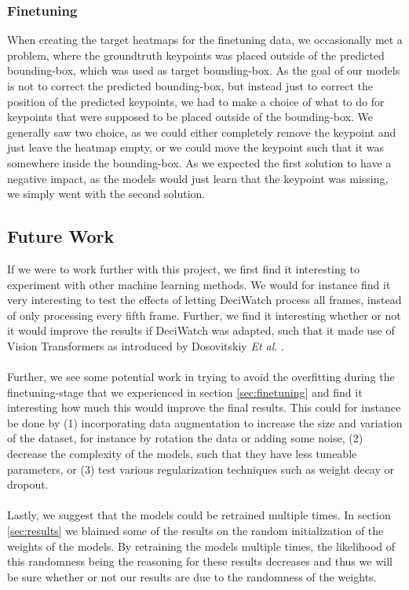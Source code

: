 \documentclass[./main.tex]{subfiles}
\begin{document}
\subsubsection{Finetuning}
When creating the target heatmaps for the finetuning data, we occasionally met a problem, where the groundtruth keypoints was placed outside of the predicted bounding-box, which was used as target bounding-box. As the goal of our models is not to correct the predicted bounding-box, but instead just to correct the position of the predicted keypoints, we had to make a choice of what to do for keypoints that were supposed to be placed outside of the bounding-box. We generally saw two choice, as we could either completely remove the keypoint and just leave the heatmap empty, or we could move the keypoint such that it was somewhere inside the bounding-box. As we expected the first solution to have a negative impact, as the models would just learn that the keypoint was missing, we simply went with the second solution.


\subsection{Future Work}
\label{sec:future_work}
If we were to work further with this project, we first find it interesting to experiment with other machine learning methods. We would for instance find it very interesting to test the effects of letting DeciWatch process all frames, instead of only processing every fifth frame. Further, we find it interesting whether or not it would improve the results if DeciWatch was adapted, such that it made use of Vision Transformers as introduced by Dosovitskiy \textit{Et al}. \cite{dosovitskiy2021image}.
\\
\\
Further, we see some potential work in trying to avoid the overfitting during the finetuning-stage that we experienced in section \ref{sec:finetuning} and find it interesting how much this would improve the final results. This could for instance be done by (1) incorporating data augmentation to increase the size and variation of the dataset, for instance by rotation the data or adding some noise, (2) decrease the complexity of the models, such that they have less tuneable parameters, or (3) test various regularization techniques such as weight decay or dropout.
\\
\\
Lastly, we suggest that the models could be retrained multiple times. In section \ref{sec:results} we blaimed some of the results on the random initialization of the weights of the models. By retraining the models multiple times, the likelihood of this randomness being the reasoning for these results decreases and thus we will be sure whether or not our results are due to the randomness of the weights.
\end{document}
